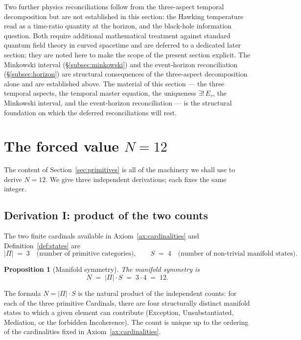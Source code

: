\documentclass[11pt,a4paper]{article}
\newtheorem{proposition}[theorem]{Proposition}
\theoremstyle{definition}
\theoremstyle{remark}
\begin{document}
Two further physics reconciliations follow from the three-aspect temporal decomposition but are not established in this section: the Hawking temperature read as a time-ratio quantity at the horizon, and the black-hole information question. Both require additional mathematical treatment against standard quantum field theory in curved spacetime and are deferred to a dedicated later section; they are noted here to make the scope of the present section explicit. The Minkowski interval (\S\ref{subsec:minkowski}) and the event-horizon reconciliation (\S\ref{subsec:horizon}) are structural consequences of the three-aspect decomposition alone and are established above. The material of this section --- the three temporal aspects, the temporal master equation, the uniqueness $\exists!\,E_{\tau}$, the Minkowski interval, and the event-horizon reconciliation --- is the structural foundation on which the deferred reconciliations will rest.

\section{The forced value \texorpdfstring{$N=12$}{N=12}}\label{sec:N12}

The content of Section~\ref{sec:primitives} is all of the machinery we shall use to derive $N=12$. We give three independent derivations; each fixes the same integer.

\subsection{Derivation I: product of the two counts}

The two finite cardinals available in Axiom~\ref{ax:cardinalities} and Definition~\ref{def:states} are
\[
|\Pi| \;=\; 3 \quad\text{(number of primitive categories)}, \qquad S \;=\; 4 \quad\text{(number of non-trivial manifold states)}.
\]

\begin{proposition}[Manifold symmetry]\label{prop:N12}
The \emph{manifold symmetry} is
\[
N \;=\; |\Pi|\cdot S \;=\; 3\cdot 4 \;=\; 12.
\]
\end{proposition}

The formula $N = |\Pi|\cdot S$ is the natural product of the independent counts: for each of the three primitive Cardinals, there are four structurally distinct manifold states to which a given element can contribute (Exception, Unsubstantiated, Mediation, or the forbidden Incoherence). The count is unique up to the ordering of the cardinalities fixed in Axiom~\ref{ax:cardinalities}.
\end{document}

